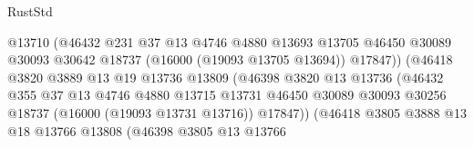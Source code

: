 \begin{lexlean}{RustStd}
\begin{coremodule}
                                        @13710
                                        (@46432
                                          @231
                                          @37
                                          @13
                                          @4746
                                          @4880
                                          @13693
                                          @13705
                                          @46450
                                          @30089
                                          @30093
                                          @30642
                                          @18737
                                          (@16000 (@19093 @13705 @13694))
                                          @17847))
                                      (@46418
                                        @3820
                                        @3889
                                        @13
                                        @19
                                        @13736
                                        @13809
                                        (@46398
                                          @3820
                                          @13
                                          @13736
                                          (@46432
                                            @355
                                            @37
                                            @13
                                            @4746
                                            @4880
                                            @13715
                                            @13731
                                            @46450
                                            @30089
                                            @30093
                                            @30256
                                            @18737
                                            (@16000 (@19093 @13731 @13716))
                                            @17847))
                                        (@46418
                                          @3805
                                          @3888
                                          @13
                                          @18
                                          @13766
                                          @13808
                                          (@46398
                                            @3805
                                            @13
                                            @13766

\end{coremodule}
\end{lexlean}
